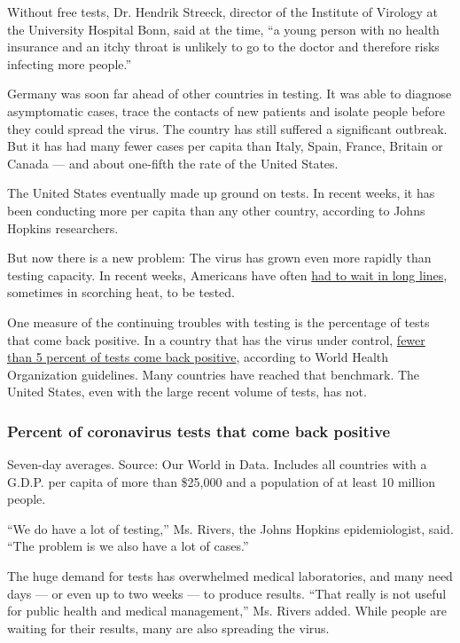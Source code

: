 Without free tests, Dr. Hendrik Streeck, director of the Institute of
Virology at the University Hospital Bonn, said at the time, ``a young
person with no health insurance and an itchy throat is unlikely to go to
the doctor and therefore risks infecting more people.''

Germany was soon far ahead of other countries in testing. It was able to
diagnose asymptomatic cases, trace the contacts of new patients and
isolate people before they could spread the virus. The country has still
suffered a significant outbreak. But it has had many fewer cases per
capita than Italy, Spain, France, Britain or Canada --- and about
one-fifth the rate of the United States.

The United States eventually made up ground on tests. In recent weeks,
it has been conducting more per capita than any other country, according
to Johns Hopkins researchers.

But now there is a new problem: The virus has grown even more rapidly
than testing capacity. In recent weeks, Americans have often
\href{https://www.nytimes.com/2020/07/06/us/coronavirus-test-shortage.html}{had
to wait in long lines}, sometimes in scorching heat, to be tested.

One measure of the continuing troubles with testing is the percentage of
tests that come back positive. In a country that has the virus under
control,
\href{https://www.nytimes.com/interactive/2020/us/coronavirus-testing.html}{fewer
than 5 percent of tests come back positive}, according to World Health
Organization guidelines. Many countries have reached that benchmark. The
United States, even with the large recent volume of tests, has not.

\hypertarget{percent-of-coronavirus-tests-that-come-back-positive}{%
\subsubsection{Percent of coronavirus tests that come back
positive}\label{percent-of-coronavirus-tests-that-come-back-positive}}

Seven-day averages. Source: Our World in Data. Includes all countries
with a G.D.P. per capita of more than \$25,000 and a population of at
least 10 million people.

``We do have a lot of testing,'' Ms. Rivers, the Johns Hopkins
epidemiologist, said. ``The problem is we also have a lot of cases.''

The huge demand for tests has overwhelmed medical laboratories, and many
need days --- or even up to two weeks --- to produce results. ``That
really is not useful for public health and medical management,'' Ms.
Rivers added. While people are waiting for their results, many are also
spreading the virus.

